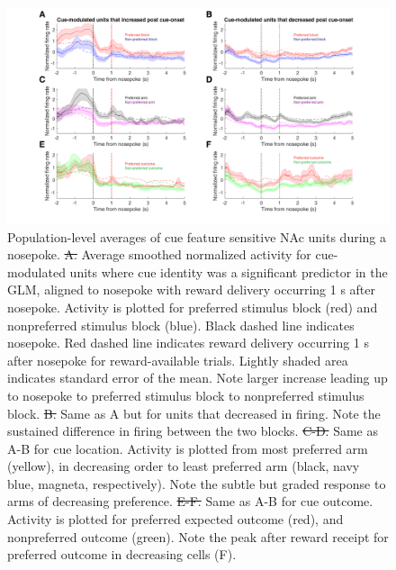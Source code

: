 \documentclass[11pt]{article}
\newcommand{\bsf}[1]{\textbf{#1}}
\providecommand{\DIFadd}[1]{{\protect\color{blue}\uwave{#1}}} %
\providecommand{\DIFdel}[1]{{\protect\color{red}\sout{#1}}}                      %
\providecommand{\DIFaddFL}[1]{\DIFadd{#1}} %
\providecommand{\DIFdelFL}[1]{\DIFdel{#1}} %
\providecommand{\DIFaddbeginFL}{} %
\providecommand{\DIFaddendFL}{} %
\providecommand{\DIFdelbeginFL}{} %
\providecommand{\DIFdelendFL}{} %
\newcommand{\DIFscaledelfig}{0.5}
\newlength{\DIFdelgraphicswidth} %
\newlength{\DIFdelgraphicsheight} %
\newcommand{\DIFaddincludegraphics}[2][]{{\color{blue}\fbox{\DIFOincludegraphics[#1]{#2}}}} %
\newcommand{\DIFdelincludegraphics}[2][]{%
\sbox{\DIFdelgraphicsbox}{\DIFOincludegraphics[#1]{#2}}%
\settoboxwidth{\DIFdelgraphicswidth}{\DIFdelgraphicsbox} %
\settoboxtotalheight{\DIFdelgraphicsheight}{\DIFdelgraphicsbox} %
\scalebox{\DIFscaledelfig}{%
\parbox[b]{\DIFdelgraphicswidth}{\usebox{\DIFdelgraphicsbox}\\[-\baselineskip] \rule{\DIFdelgraphicswidth}{0em}}\llap{\resizebox{\DIFdelgraphicswidth}{\DIFdelgraphicsheight}{%
\setlength{\unitlength}{\DIFdelgraphicswidth}%
\begin{picture}(1,1)%
\thicklines\linethickness{2pt} %
{\color[rgb]{1,0,0}\put(0,0){\framebox(1,1){}}}%
{\color[rgb]{1,0,0}\put(0,0){\line( 1,1){1}}}%
{\color[rgb]{1,0,0}\put(0,1){\line(1,-1){1}}}%
\end{picture}%
}\hspace*{3pt}}} %
} %
\DeclareRobustCommand{\DIFaddbeginFL}{\DIFOaddbeginFL \let\includegraphics\DIFaddincludegraphics} %
\DeclareRobustCommand{\DIFaddendFL}{\DIFOaddendFL \let\includegraphics\DIFOincludegraphics} %
\DeclareRobustCommand{\DIFdelbeginFL}{\DIFOdelbeginFL \let\includegraphics\DIFdelincludegraphics} %
\DeclareRobustCommand{\DIFdelendFL}{\DIFOaddendFL \let\includegraphics\DIFOincludegraphics} %
\begin{document}
{\begin{figure}[h]
\centering
\includegraphics[width=\textwidth]{Fig 11 - NP population averages.png}
\caption{Population-level averages of cue feature sensitive NAc units during a
  nosepoke. \DIFdelbeginFL \DIFdelFL{A. }\DIFdelendFL \DIFaddbeginFL \DIFaddFL{\bsf{A}: }\DIFaddendFL Average smoothed normalized activity for cue-modulated
  units where cue identity was a significant predictor in the GLM, aligned to
  nosepoke with reward delivery occurring 1 s after nosepoke. Activity is
  plotted for preferred stimulus block (red) and nonpreferred stimulus block
  (blue). Black dashed line indicates nosepoke. Red dashed line indicates reward
  delivery occurring 1 s after nosepoke for reward-available trials. Lightly
  shaded area indicates standard error of the mean. Note larger increase leading
  up to nosepoke to preferred stimulus block to nonpreferred stimulus
  block. \DIFdelbeginFL \DIFdelFL{B. }\DIFdelendFL \DIFaddbeginFL \DIFaddFL{\bsf{B}: }\DIFaddendFL Same as A but for units that decreased in firing. Note the
  sustained difference in firing between the two blocks. \DIFdelbeginFL \DIFdelFL{C-D. }\DIFdelendFL \DIFaddbeginFL \DIFaddFL{\bsf{C-D}: }\DIFaddendFL Same as A-B
  for cue location. Activity is plotted from most preferred arm (yellow), in
  decreasing order to least preferred arm (black, navy blue, magneta,
  respectively). Note the subtle but graded response to arms of decreasing
  preference. \DIFdelbeginFL \DIFdelFL{E-F. }\DIFdelendFL \DIFaddbeginFL \DIFaddFL{\bsf{E-F}: }\DIFaddendFL Same as A-B for cue outcome. Activity is plotted for
  preferred expected outcome (red), and nonpreferred outcome (green). Note the
  peak after reward receipt for preferred outcome in decreasing cells (F).}
\label{fig:NP_pop}
\end{figure}
\begin{figure}

\end{figure}}
\end{document}
